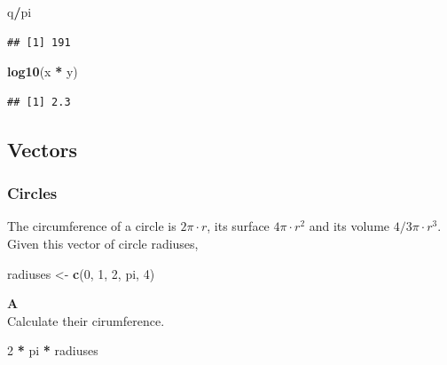 \documentclass[]{book}
\newenvironment{Shaded}{\begin{snugshade}}{\end{snugshade}}
\newcommand{\DecValTok}[1]{\textcolor[rgb]{0.00,0.00,0.81}{#1}}
\newcommand{\KeywordTok}[1]{\textcolor[rgb]{0.13,0.29,0.53}{\textbf{#1}}}
\newcommand{\NormalTok}[1]{#1}
\newcommand{\OperatorTok}[1]{\textcolor[rgb]{0.81,0.36,0.00}{\textbf{#1}}}
\newcommand{\StringTok}[1]{\textcolor[rgb]{0.31,0.60,0.02}{#1}}
\begin{document}
\begin{Shaded}
\begin{Highlighting}[]
\NormalTok{q}\OperatorTok{/}\NormalTok{pi}
\end{Highlighting}
\end{Shaded}

\begin{verbatim}
## [1] 191
\end{verbatim}

\begin{Shaded}
\begin{Highlighting}[]
\KeywordTok{log10}\NormalTok{(x }\OperatorTok{*}\StringTok{ }\NormalTok{y)}
\end{Highlighting}
\end{Shaded}

\begin{verbatim}
## [1] 2.3
\end{verbatim}

\hypertarget{vectors-2}{%
\subsection{Vectors}\label{vectors-2}}

\hypertarget{circles-1}{%
\subsubsection*{Circles}\label{circles-1}}

The circumference of a circle is \(2\pi\cdot r\), its surface \(4\pi \cdot r^2\) and its volume \(4/3 \pi\cdot r^3\).
Given this vector of circle radiuses,

\begin{Shaded}
\begin{Highlighting}[]
\NormalTok{radiuses <-}\StringTok{ }\KeywordTok{c}\NormalTok{(}\DecValTok{0}\NormalTok{, }\DecValTok{1}\NormalTok{, }\DecValTok{2}\NormalTok{, pi, }\DecValTok{4}\NormalTok{)}
\end{Highlighting}
\end{Shaded}

\textbf{A}\\
Calculate their cirumference.

\begin{Shaded}
\begin{Highlighting}[]
\DecValTok{2} \OperatorTok{*}\StringTok{ }\NormalTok{pi }\OperatorTok{*}\StringTok{ }\NormalTok{radiuses}
\end{Highlighting}
\end{Shaded}
\end{document}
